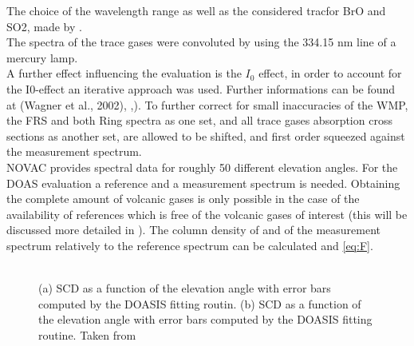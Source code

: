 %
The choice of the wavelength range as well as the considered tracfor BrO and SO2, made by \citet{vogel2011volcanic}.\\
The spectra of the trace gases were convoluted by using the 334.15 nm line of a mercury lamp.\\
A further effect influencing the evaluation is the $I_{0}$ effect, in order to account for the I0-effect \citep{platt2008differential} an iterative approach was used. Further informations can be found at (Wagner et al., 2002), \cite{lubcke2014bro},\cite{vogel2011volcanic}).
To further correct for small inaccuracies of the WMP, the FRS and both Ring spectra as one set, and all trace gases absorption cross sections as another set, are allowed to be shifted, and first order squeezed against the measurement spectrum.\\
%
NOVAC provides spectral data for roughly 50 different elevation angles. For the DOAS evaluation a reference and a measurement spectrum is needed. Obtaining the complete amount of volcanic gases is only possible in the case of the availability of references which is free of the volcanic gases of interest (this will be discussed more detailed in ). The column density of    and  of the measurement spectrum relatively to the reference spectrum can be calculated  and \ref{eq:F}. \\
\\
\begin{figure}
	\caption{(a)  SCD as a function of the elevation angle with error bars computed by the DOASIS fitting routin. (b)  SCD as a function of the elevation angle with error bars computed by the DOASIS fitting routine.  Taken from \cite{WarnachSimon}}
	\label{fig:plumeref}
\end{figure}
